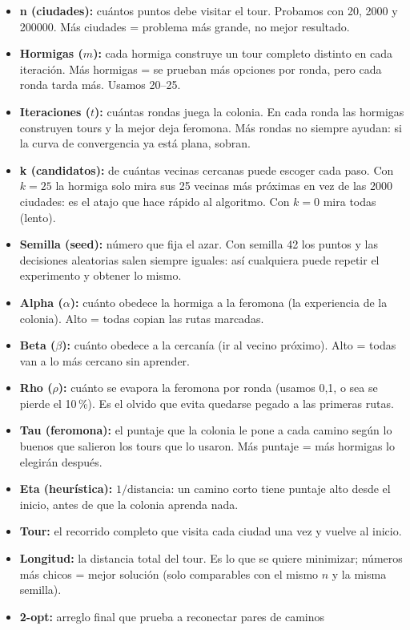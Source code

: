 \documentclass[12pt,a4paper]{article}
\begin{document}
\begin{itemize}
\item \textbf{n (ciudades):} cuántos puntos debe visitar el tour. Probamos con
20, 2000 y 200000. Más ciudades = problema más grande, no mejor resultado.
\item \textbf{Hormigas ($m$):} cada hormiga construye un tour completo distinto
en cada iteración. Más hormigas = se prueban más opciones por ronda, pero cada
ronda tarda más. Usamos 20--25.
\item \textbf{Iteraciones ($t$):} cuántas rondas juega la colonia. En cada
ronda las hormigas construyen tours y la mejor deja feromona. Más rondas no
siempre ayudan: si la curva de convergencia ya está plana, sobran.
\item \textbf{k (candidatos):} de cuántas vecinas cercanas puede escoger cada
paso. Con $k = 25$ la hormiga solo mira sus 25 vecinas más próximas en vez de
las 2000 ciudades: es el atajo que hace rápido al algoritmo. Con $k = 0$ mira
todas (lento).
\item \textbf{Semilla (seed):} número que fija el azar. Con semilla 42 los
puntos y las decisiones aleatorias salen siempre iguales: así cualquiera puede
repetir el experimento y obtener lo mismo.
\item \textbf{Alpha ($\alpha$):} cuánto obedece la hormiga a la feromona (la
experiencia de la colonia). Alto = todas copian las rutas marcadas.
\item \textbf{Beta ($\beta$):} cuánto obedece a la cercanía (ir al vecino
próximo). Alto = todas van a lo más cercano sin aprender.
\item \textbf{Rho ($\rho$):} cuánto se evapora la feromona por ronda (usamos
0,1, o sea se pierde el 10\,\%). Es el olvido que evita quedarse pegado a las
primeras rutas.
\item \textbf{Tau (feromona):} el puntaje que la colonia le pone a cada camino
según lo buenos que salieron los tours que lo usaron. Más puntaje = más
hormigas lo elegirán después.
\item \textbf{Eta (heurística):} $1/\text{distancia}$: un camino corto tiene
puntaje alto desde el inicio, antes de que la colonia aprenda nada.
\item \textbf{Tour:} el recorrido completo que visita cada ciudad una vez y
vuelve al inicio.
\item \textbf{Longitud:} la distancia total del tour. Es lo que se quiere
minimizar; números más chicos = mejor solución (solo comparables con el mismo
$n$ y la misma semilla).
\item \textbf{2-opt:} arreglo final que prueba a reconectar pares de caminos

\end{itemize}
\end{document}

